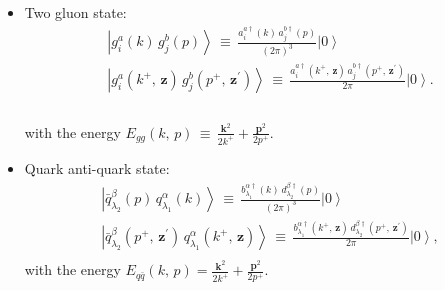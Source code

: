 \documentclass[10pt]{article}
\numberwithin{equation}{section}
\begin{document}
\begin{itemize}
For completeness we  note $E_{g}(k)=\frac{\mathbf{k}^{2}}{2k^{+}}.$ 
\item Two gluon state: 
  \begin{equation}\begin{split}\label{ggst}
&\left|g_{i}^{a}(k)\, g_{j}^{b}(p)\right\rangle \,\equiv\,\frac{a_{i}^{a\dagger}(k)\, a_{j}^{b\dagger}(p)}{(2\pi)^{3}}\left|0\right\rangle \qquad \\
&\left|g_{i}^{a}(k^{+},\,\mathbf{z})\, g_{j}^{b}(p^{+},\,\mathbf{z}^{\prime})\right\rangle \,\equiv\,\frac{a_{i}^{a\dagger}(k^{+},\,\mathbf{z})\, a_{j}^{b\dagger}(p^{+},\,\mathbf{z}^{\prime})}{2\pi}\left|0\right\rangle .\\
  \end{split}\end{equation}\\
  with the energy $E_{gg}(k,\, p)\,\equiv\,\frac{\mathbf{k}^{2}}{2k^{+}}+\frac{\mathbf{p}^{2}}{2p^{+}}$.\\
\item Quark anti-quark state:
  \begin{equation}
    \begin{split}
      \label{qqst}
    &\left|\bar{q}_{\lambda_{2}}^{\beta}(p)\, q_{\lambda_{1}}^{\alpha}(k)\right\rangle \,\equiv\,\frac{b_{\lambda_{1}}^{\alpha\dagger}(k)\, d_{\lambda_{2}}^{\beta\dagger}(p)}{(2\pi)^{3}}\left|0\right\rangle \quad\; \\
    &\left|\bar{q}_{\lambda_{2}}^{\beta}(p^{+},\,\mathbf{z}^{\prime})\, q_{\lambda_{1}}^{\alpha}(k^{+},\,\mathbf{z})\right\rangle \,\equiv\,\frac{b_{\lambda_{1}}^{\alpha\dagger}(k^{+},\,\mathbf{z})\, d_{\lambda_{2}}^{\beta\dagger}(p^{+},\,\mathbf{z}^{\prime})}{2\pi}\left|0\right\rangle ,\\
    \end{split}
  \end{equation}
  with the energy $E_{q\bar{q}}(k,\, p)=\frac{\mathbf{k}^{2}}{2k^{+}}+\frac{\mathbf{p}^{2}}{2p^{+}}$.

\end{itemize}
\newpage 
\end{document}
